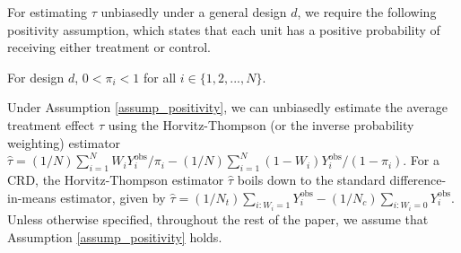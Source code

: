 \documentclass[12pt]{article}
\begin{document}
For estimating $\tau$ unbiasedly under a general design $d$, we require the following positivity assumption, which states that each unit has a positive probability of receiving either treatment or control.
\begin{assumption}[Positivity] \normalfont
    For design $d$, $0<\pi_i<1$ for all $i \in \{1,2,...,N\}$.
    \label{assump_positivity}
\end{assumption}
Under Assumption \ref{assump_positivity}, we can unbiasedly estimate the average treatment effect $\tau$ using the Horvitz-Thompson (or the inverse probability weighting) estimator $\hat{\tau} = (1/N)\sum_{i=1}^{N}W_i Y^{\text{obs}}_i/\pi_i - (1/N)\sum_{i=1}^{N}(1-W_i) Y^{\text{obs}}_i/(1-\pi_i).$
For a CRD, the Horvitz-Thompson estimator $\hat{\tau}$ boils down to the standard difference-in-means estimator, given by $\hat{\tau} = (1/N_t)\sum_{i:W_i = 1}Y^{\text{obs}}_i -  (1/N_c)\sum_{i:W_i = 0}Y^{\text{obs}}_i.$
Unless otherwise specified, throughout the rest of the paper, we assume that Assumption \ref{assump_positivity} holds.  
\end{document}
